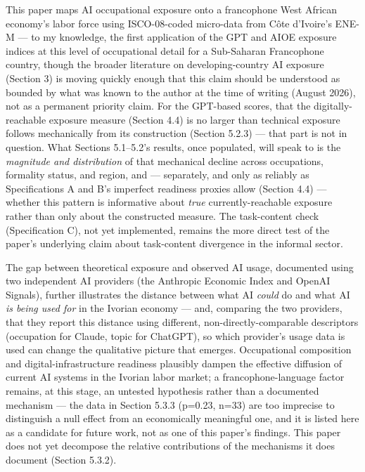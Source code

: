 \documentclass[
  11pt,
]{article}
\begin{document}
This paper maps AI occupational exposure onto a francophone West African
economy's labor force using ISCO-08-coded micro-data from Côte
d'Ivoire's ENE-M --- to my knowledge, the first application of the GPT
and AIOE exposure indices at this level of occupational detail for a
Sub-Saharan Francophone country, though the broader literature on
developing-country AI exposure (Section 3) is moving quickly enough that
this claim should be understood as bounded by what was known to the
author at the time of writing (August 2026), not as a permanent priority
claim. For the GPT-based scores, that the digitally-reachable exposure
measure (Section 4.4) is no larger than technical exposure follows
mechanically from its construction (Section 5.2.3) --- that part is not
in question. What Sections 5.1--5.2's results, once populated, will
speak to is the \emph{magnitude and distribution} of that mechanical
decline across occupations, formality status, and region, and ---
separately, and only as reliably as Specifications A and B's imperfect
readiness proxies allow (Section 4.4) --- whether this pattern is
informative about \emph{true} currently-reachable exposure rather than
only about the constructed measure. The task-content check
(Specification C), not yet implemented, remains the more direct test of
the paper's underlying claim about task-content divergence in the
informal sector.

The gap between theoretical exposure and observed AI usage, documented
using two independent AI providers (the Anthropic Economic Index and
OpenAI Signals), further illustrates the distance between what AI
\emph{could} do and what AI \emph{is being used for} in the Ivorian
economy --- and, comparing the two providers, that they report this
distance using different, non-directly-comparable descriptors
(occupation for Claude, topic for ChatGPT), so which provider's usage
data is used can change the qualitative picture that emerges.
Occupational composition and digital-infrastructure readiness plausibly
dampen the effective diffusion of current AI systems in the Ivorian
labor market; a francophone-language factor remains, at this stage, an
untested hypothesis rather than a documented mechanism --- the data in
Section 5.3.3 (p=0.23, n=33) are too imprecise to distinguish a null
effect from an economically meaningful one, and it is listed here as a
candidate for future work, not as one of this paper's findings. This
paper does not yet decompose the relative contributions of the
mechanisms it does document (Section 5.3.2).
\end{document}

